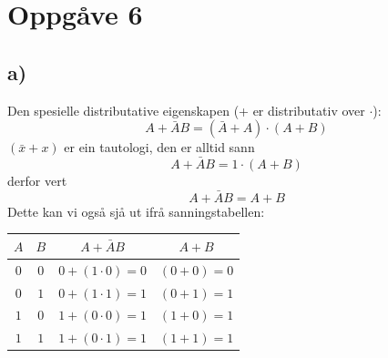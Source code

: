 \documentclass[12pt,a4paper]{article}
\begin{document}
  \section{Oppgåve 6}
    \subsection{a)}
      Den spesielle distributative eigenskapen (+ er distributativ over $\cdot$):
      \begin{equation}
        A + \bar{A}B = (\bar{A} + A) \cdot (A + B)
      \end{equation}
      $(\bar{x} + x)$ er ein tautologi, den er alltid sann
      \begin{equation}
        A + \bar{A}B = 1 \cdot (A + B)
      \end{equation}
      derfor vert
      \begin{equation}
        A + \bar{A}B = A + B
      \end{equation}
      Dette kan vi også sjå ut ifrå sanningstabellen:

      \begin{center}
        \begin{tabular}{ |c|c|c|c| }
          \hline
          $A$ & $B$ & $A+\bar{A}B$  & $A+B$ \\
          \hline
          $0$ & $0$ & $0+(1\cdot0)=0$ & $(0+0)=0$ \\
          \hline
          $0$ & $1$ & $0+(1\cdot1)=1$ & $(0+1)=1$ \\
          \hline
          $1$ & $0$ & $1+(0\cdot0)=1$ & $(1+0)=1$ \\
          \hline
          $1$ & $1$ & $1+(0\cdot1)=1$ & $(1+1)=1$ \\
          \hline
        \end{tabular}
      \end{center}

    \newpage
\end{document}
